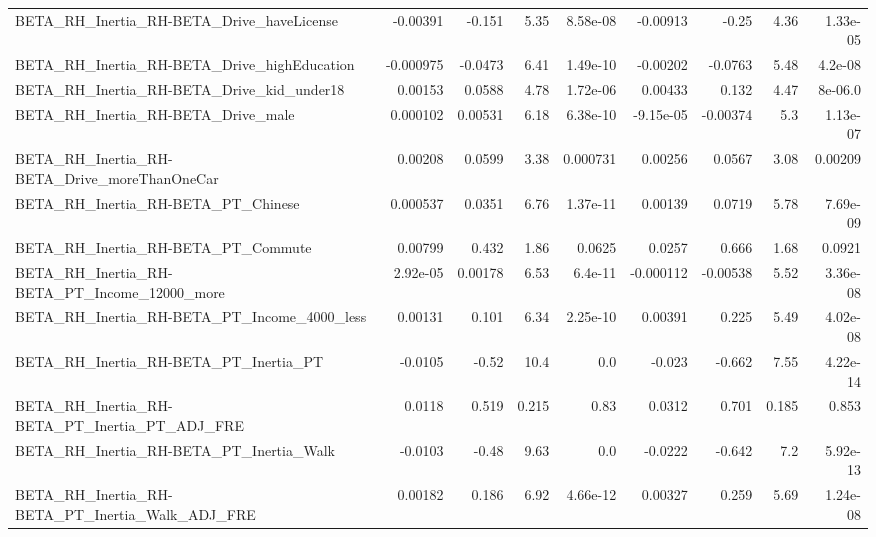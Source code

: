 \begin{tabular}{lrrrrrrrr}
BETA\_RH\_Inertia\_RH-BETA\_Drive\_haveLicense          &    -0.00391 &       -0.151 &     5.35 & 8.58e-08 &   -0.00913 &       -0.25 &         4.36 &      1.33e-05 \\
BETA\_RH\_Inertia\_RH-BETA\_Drive\_highEducation        &   -0.000975 &      -0.0473 &     6.41 & 1.49e-10 &   -0.00202 &     -0.0763 &         5.48 &       4.2e-08 \\
BETA\_RH\_Inertia\_RH-BETA\_Drive\_kid\_under18          &     0.00153 &       0.0588 &     4.78 & 1.72e-06 &    0.00433 &       0.132 &         4.47 &       8e-06.0 \\
BETA\_RH\_Inertia\_RH-BETA\_Drive\_male                 &    0.000102 &      0.00531 &     6.18 & 6.38e-10 &  -9.15e-05 &    -0.00374 &          5.3 &      1.13e-07 \\
BETA\_RH\_Inertia\_RH-BETA\_Drive\_moreThanOneCar       &     0.00208 &       0.0599 &     3.38 & 0.000731 &    0.00256 &      0.0567 &         3.08 &       0.00209 \\
BETA\_RH\_Inertia\_RH-BETA\_PT\_Chinese                 &    0.000537 &       0.0351 &     6.76 & 1.37e-11 &    0.00139 &      0.0719 &         5.78 &      7.69e-09 \\
BETA\_RH\_Inertia\_RH-BETA\_PT\_Commute                 &     0.00799 &        0.432 &     1.86 &   0.0625 &     0.0257 &       0.666 &         1.68 &        0.0921 \\
BETA\_RH\_Inertia\_RH-BETA\_PT\_Income\_12000\_more       &    2.92e-05 &      0.00178 &     6.53 &  6.4e-11 &  -0.000112 &    -0.00538 &         5.52 &      3.36e-08 \\
BETA\_RH\_Inertia\_RH-BETA\_PT\_Income\_4000\_less        &     0.00131 &        0.101 &     6.34 & 2.25e-10 &    0.00391 &       0.225 &         5.49 &      4.02e-08 \\
BETA\_RH\_Inertia\_RH-BETA\_PT\_Inertia\_PT              &     -0.0105 &        -0.52 &     10.4 &      0.0 &     -0.023 &      -0.662 &         7.55 &      4.22e-14 \\
BETA\_RH\_Inertia\_RH-BETA\_PT\_Inertia\_PT\_ADJ\_FRE      &      0.0118 &        0.519 &    0.215 &     0.83 &     0.0312 &       0.701 &        0.185 &         0.853 \\
BETA\_RH\_Inertia\_RH-BETA\_PT\_Inertia\_Walk            &     -0.0103 &        -0.48 &     9.63 &      0.0 &    -0.0222 &      -0.642 &          7.2 &      5.92e-13 \\
BETA\_RH\_Inertia\_RH-BETA\_PT\_Inertia\_Walk\_ADJ\_FRE    &     0.00182 &        0.186 &     6.92 & 4.66e-12 &    0.00327 &       0.259 &         5.69 &      1.24e-08 \\

\end{tabular}
